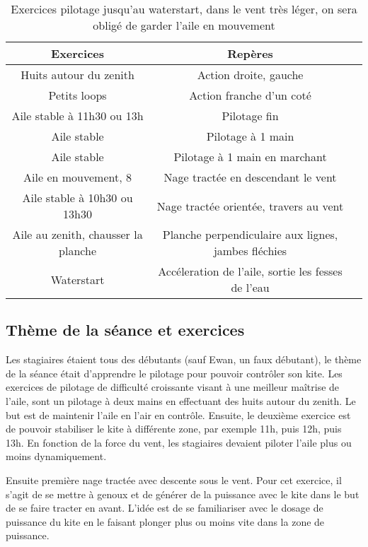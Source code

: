 \documentclass[11pt,a4paper]{report}
\begin{document}
\begin{table}
\begin{tabular}{|c|c|c|}
\hline
\textbf{Exercices}     &  \textbf{Repères}      \\
\hline 
Huits autour du zenith & Action droite, gauche   \\
\hline
Petits loops  & Action franche d'un coté  \\
\hline 
Aile stable à 11h30 ou 13h & Pilotage fin \\
\hline
Aile stable               & Pilotage à 1 main \\
\hline 
Aile stable               & Pilotage à 1 main en marchant \\
\hline
Aile en mouvement, 8      & Nage tractée en descendant le vent \\
\hline 
Aile stable à 10h30 ou 13h30   	& Nage tractée orientée, travers au vent \\
\hline
Aile au zenith, chausser la planche  & Planche perpendiculaire aux lignes, jambes fléchies \\
\hline
Waterstart                           &  Accéleration de l'aile, sortie les fesses de l'eau \\
\hline
\end{tabular}
\caption{Exercices pilotage jusqu'au waterstart, dans le vent très léger, on sera obligé de garder l'aile en mouvement\label{seance_pilotage}}
\end{table}

\subsection{Thème de la séance et exercices}
Les stagiaires étaient tous des débutants (sauf Ewan, un faux débutant), 
le thème de la séance était d'apprendre le pilotage pour pouvoir contrôler son kite.
Les exercices de pilotage de difficulté croissante visant à une
meilleur maîtrise de l'aile, sont un pilotage à deux mains en effectuant des huits
autour du zenith. Le but est de maintenir l'aile en l'air en contrôle.
Ensuite, le deuxième exercice est de pouvoir stabiliser le kite à différente 
zone, par exemple 11h, puis 12h, puis 13h.
En fonction de la force du vent, les stagiaires
devaient piloter l'aile plus ou moins dynamiquement. 

Ensuite première nage tractée avec descente sous 
le vent. Pour cet exercice, il s'agit de se mettre à genoux
et de générer de la puissance avec le kite dans le but
de se faire tracter en avant.  L'idée est de se familiariser
avec le dosage de puissance du kite en le faisant plonger
plus ou moins vite dans la zone de puissance.
\end{document}
